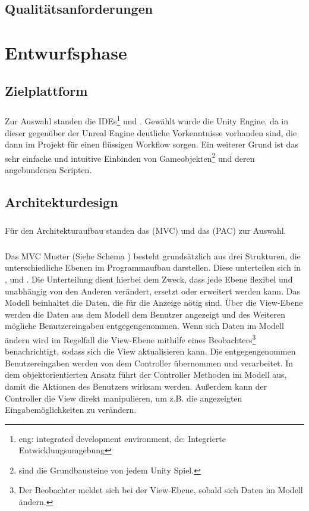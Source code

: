 \section{Qualitätsanforderungen}
\paragraph{}


\chapter{Entwurfsphase}
\section{Zielplattform}
\paragraph{}
Zur Auswahl standen die IDEs\footnote{eng: integrated development environment, de: Integrierte Entwicklungsumgebung}  und . Gewählt wurde die Unity Engine, da in dieser gegenüber der Unreal Engine deutliche Vorkenntnisse vorhanden sind, die dann im Projekt für einen flüssigen Workflow sorgen. Ein weiterer Grund ist das sehr einfache und intuitive Einbinden von Gameobjekten\footnote{ sind die Grundbausteine von jedem Unity Spiel.} und deren angebundenen Scripten.

\section{Architekturdesign}
\paragraph{}
Für den Architekturaufbau standen das  (MVC) und das  (PAC) zur Auswahl.
\paragraph{}
Das MVC Muster (Siehe Schema ) besteht grundsätzlich aus drei Strukturen, die unterschiedliche Ebenen im Programmaufbau darstellen.
Diese unterteilen sich in ,  und . Die Unterteilung dient hierbei dem Zweck, dass jede Ebene flexibel und unabhängig von den Anderen verändert, ersetzt oder erweitert werden kann. 
Das Modell beinhaltet die Daten, die für die Anzeige nötig sind. Über die View-Ebene werden die Daten aus dem Modell dem Benutzer angezeigt und des Weiteren mögliche Benutzereingaben entgegengenommen. Wenn sich Daten im Modell ändern wird im Regelfall die View-Ebene mithilfe eines Beobachters\footnote{Der Beobachter meldet sich bei der View-Ebene, sobald sich Daten im Modell ändern.} benachrichtigt, sodass sich die View aktualisieren kann. Die entgegengenommen Benutzereingaben werden von dem Controller übernommen und verarbeitet. In dem objektorientierten Ansatz führt der Controller Methoden im Modell aus, damit die Aktionen des Benutzers wirksam werden. Außerdem kann der Controller die View direkt manipulieren, um z.B. die angezeigten Eingabemöglichkeiten zu verändern. 
